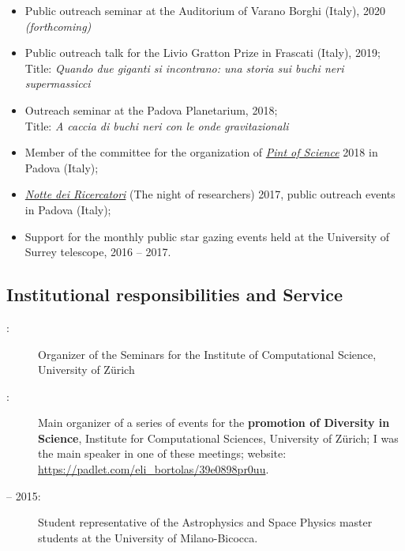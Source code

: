 \documentclass[11pt,a4paper]{article}
\begin{document}
\begin{itemize}

    \item Public outreach seminar at the Auditorium of Varano Borghi (Italy), 2020 {\it(forthcoming)}
    
    \item  Public outreach talk for the Livio Gratton Prize  in Frascati (Italy), 2019;\\
    Title: \textit{Quando due giganti si incontrano: una storia sui buchi neri supermassicci} %

    \item Outreach seminar at the Padova Planetarium, 2018;\\
    Title: \textit{A caccia di buchi neri con le onde gravitazionali}%

    \item Member of the committee for the organization of \href{https://pintofscience.com/}{\it Pint of Science} 2018 in Padova (Italy);
    
    \item \href{http://www.venetonight.it/}{\it Notte dei Ricercatori} (The night of researchers) 2017, public outreach events in Padova  (Italy);
    
    
    \item Support for the monthly public star gazing events held at the University of Surrey telescope, 2016 -- 2017.

\end{itemize}



\subsection*{Institutional responsibilities and Service}

\begin{description}

    \item[ :] Organizer of the Seminars for the Institute of Computational Science, University of Z\"urich
    
    \item[ :] Main organizer of a series of  events  for the \textbf{promotion of Diversity in Science}, Institute for Computational Sciences, University of Z\"urich; I was the main speaker in one of these meetings; website: \href{https://padlet.com/eli_bortolas/39e0898pr0uu}{https://padlet.com/eli\_bortolas/39e0898pr0uu}.

    \item[  -- 2015:] Student representative of the Astrophysics and Space Physics master students at the University of Milano-Bicocca.
    
\end{description}
\end{document}
